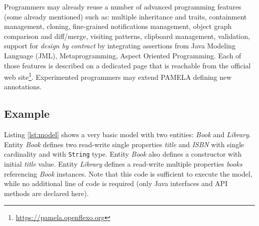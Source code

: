 Programmers may already reuse a number of advanced programming features
(some already mentioned) such as: multiple inheritance and traits, containment
management, cloning, fine-grained notifications management, object graph
comparison and diff/merge, visiting patterns, clipboard management, validation,
support for \emph{design by contract} by integrating assertions from Java
Modeling Language (JML), Metaprogramming, Aspect Oriented Programming. Each of
those features is described on a dedicated page that is reachable from the
official web site\footnote{\url{https://pamela.openflexo.org}}.
Experimented programmers may extend PAMELA defining new annotations.


\subsection{Example}

Listing \ref{lst:model} shows a very basic model with two entities: \emph{Book} and \emph{Library}. Entity \emph{Book} defines two read-write single properties \emph{title} and \emph{ISBN} with single cardinality and with \texttt{String} type. Entity \emph{Book} also defines a constructor with initial \emph{title} value. Entity \emph{Library} defines a read-write multiple properties \emph{books} referencing \emph{Book} instances. Note that this code is sufficient to execute the model, while no additional line of code is required (only Java interfaces and API methods are declared here). 

